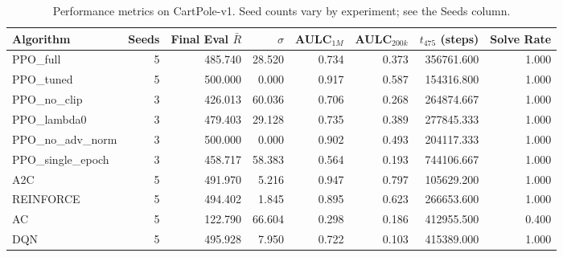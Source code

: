 \begin{table}[h]
\centering
\caption{Performance metrics on CartPole-v1. Seed counts vary by experiment; see the Seeds column.}
\label{tab:metrics}
\small
\begin{tabular}{lrrrrrrr}
\toprule
Algorithm & Seeds & Final Eval $\bar{R}$ & $\sigma$ & AULC$_{1M}$ & AULC$_{200k}$ & $t_{475}$ (steps) & Solve Rate \\
\midrule
PPO_full & 5 & 485.740 & 28.520 & 0.734 & 0.373 & 356761.600 & 1.000 \\
PPO_tuned & 5 & 500.000 & 0.000 & 0.917 & 0.587 & 154316.800 & 1.000 \\
PPO_no_clip & 3 & 426.013 & 60.036 & 0.706 & 0.268 & 264874.667 & 1.000 \\
PPO_lambda0 & 3 & 479.403 & 29.128 & 0.735 & 0.389 & 277845.333 & 1.000 \\
PPO_no_adv_norm & 3 & 500.000 & 0.000 & 0.902 & 0.493 & 204117.333 & 1.000 \\
PPO_single_epoch & 3 & 458.717 & 58.383 & 0.564 & 0.193 & 744106.667 & 1.000 \\
A2C & 5 & 491.970 & 5.216 & 0.947 & 0.797 & 105629.200 & 1.000 \\
REINFORCE & 5 & 494.402 & 1.845 & 0.895 & 0.623 & 266653.600 & 1.000 \\
AC & 5 & 122.790 & 66.604 & 0.298 & 0.186 & 412955.500 & 0.400 \\
DQN & 5 & 495.928 & 7.950 & 0.722 & 0.103 & 415389.000 & 1.000 \\
\bottomrule
\end{tabular}

\end{table}